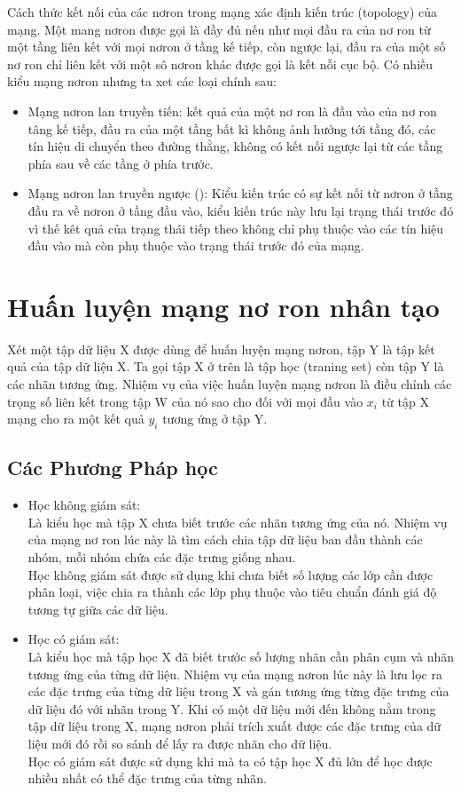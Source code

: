 \documentclass[13pt, a4paper]{extreport}
\begin{document}
\indent Cách thức kết nối của các nơron trong mạng xác định kiến trúc (topology) của mạng. Một mang nơron được gọi là đầy đủ nếu như mọi đầu ra của nơ ron từ một tầng liên kết với mọi nơron ở tầng kế tiếp, còn ngược lại, đầu ra của một số nơ ron chỉ liên kết với một sô nơron khác được gọi là kết nỗi cục bộ. Có nhiều kiểu mạng nơron nhưng ta xet các loại chính sau:
\begin{itemize}
\item Mạng nơron lan truyền tiến: kết quả của một nơ ron là đầu vào của nơ ron tâng kế tiếp, đầu ra của một tầng bất kì không ảnh hưởng tới tầng đó, các tín hiệu di chuyển theo đường thằng, không có kết nối ngược lại từ các tầng phía sau về các tầng ở phía trước.
\item Mạng nơron lan truyền ngược (): Kiểu kiến trúc có sự kết nối từ nơron ở tầng đầu ra về nơron ở tầng đầu vào, kiểu kiến trúc này lưu lại trạng thái trước đó vì thế kêt quả của trạng thái tiếp theo không chỉ phụ thuộc vào các tín hiệu đầu vào mà còn phụ thuộc vào trạng thái trước đó của mạng.
\end{itemize}
\section{Huấn luyện mạng nơ ron nhân tạo}
Xét một tập dữ liệu X được dùng để huấn luyện mạng nơron, tập Y là tập kết quả của tập dữ liệu X. Ta gọi tập X ở trên là tập học (traning set) còn tập Y là các nhãn tương ứng. Nhiệm vụ của việc huấn luyện mạng nơron là điều chỉnh các trọng số liên kết trong tập W của nó sao cho đối với mọi đầu vào $x_i$ từ tập X mạng cho ra một kết quả $y_i$ tương ứng ở tập Y.
\subsection{Các Phương Pháp học}
\begin{itemize}
	\item Học không giám sát:\\
	\indent Là kiểu học mà tập X chưa biết trước các nhãn tương ứng của nó. Nhiệm vụ của mạng nơ ron lúc này là tìm cách chia tập dữ liệu ban đầu thành các nhóm, mỗi nhóm chứa các đặc trưng giống nhau.\\
	\indent Học không giám sát được sử dụng khi chưa biết số lượng các lớp cần được phân loại, việc chia ra thành các lớp phụ thuộc vào tiêu chuẩn đánh giá độ tương tự giữa các dữ liệu.
	\item Học có giám sát:\\
	\indent Là kiểu học mà tập học X đã biết trước số lượng nhãn cần phân cụm và nhãn tương ứng của từng dữ liệu. Nhiệm vụ của mạng nơron lúc này là lưu lọc ra các đặc trưng của từng dữ liệu trong X và gán tương ứng từng đặc trưng của dữ liệu đó với nhãn trong Y. Khi có một dữ liệu mới đến không nằm trong tập dữ liệu trong X, mạng nơron phải trích xuất được các đặc trưng của dữ liệu mới đó rồi so sánh để lấy ra được nhãn cho dữ liệu.\\
	\indent Học có giám sát được sử dụng khi mà ta có tập học X đủ lớn để học được nhiều nhất có thể đặc trưng của từng nhãn.
\end{itemize}
\end{document}
